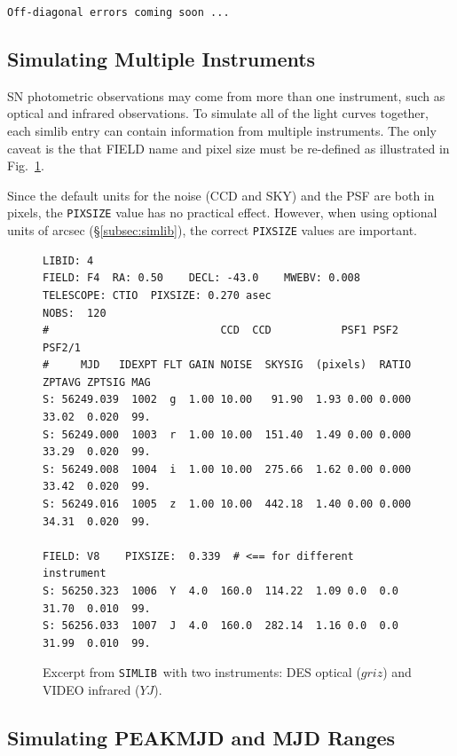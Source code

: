 \documentclass[12pt]{article}
\newcommand{\simlib}{{\tt SIMLIB}}
\begin{document}
{\bigskip
{\tt Off-diagonal errors coming soon ...}


   \clearpage
   \subsection{Simulating Multiple Instruments}
   \label{subsec:multi_telescope}

SN photometric observations may come from more than one instrument,
such as optical and infrared observations. 
To simulate all of the light curves together, 
each simlib entry can contain information from multiple
instruments. The only caveat is the that FIELD name and
pixel size must be re-defined as illustrated in 
Fig.~\ref{fig:simlib_merge}.

Since the default units for the noise (CCD and SKY)
and the PSF are both in pixels, the {\tt PIXSIZE} value
has no practical effect. However, when using optional 
units of arcsec (\S\ref{subsec:simlib}),
the correct {\tt PIXSIZE} values are important.
%
\begin{figure} [hb] 
\begin{center}
\begin{Verbatim}[frame=single]
LIBID: 4 
FIELD: F4  RA: 0.50    DECL: -43.0    MWEBV: 0.008
TELESCOPE: CTIO  PIXSIZE: 0.270 asec
NOBS:  120
#                           CCD  CCD           PSF1 PSF2 PSF2/1                    
#     MJD   IDEXPT FLT GAIN NOISE  SKYSIG  (pixels)  RATIO ZPTAVG ZPTSIG MAG 
S: 56249.039  1002  g  1.00 10.00   91.90  1.93 0.00 0.000  33.02  0.020  99.
S: 56249.000  1003  r  1.00 10.00  151.40  1.49 0.00 0.000  33.29  0.020  99.
S: 56249.008  1004  i  1.00 10.00  275.66  1.62 0.00 0.000  33.42  0.020  99.
S: 56249.016  1005  z  1.00 10.00  442.18  1.40 0.00 0.000  34.31  0.020  99.

FIELD: V8    PIXSIZE:  0.339  # <== for different instrument
S: 56250.323  1006  Y  4.0  160.0  114.22  1.09 0.0  0.0    31.70  0.010  99.
S: 56256.033  1007  J  4.0  160.0  282.14  1.16 0.0  0.0    31.99  0.010  99.
\end{Verbatim}
\end{center}
\caption{
  Excerpt from \simlib\ with two instruments:
  DES optical ($griz$) and VIDEO infrared ($YJ$).
 }
\label{fig:simlib_merge}
\end{figure}


   \clearpage
   \subsection{Simulating PEAKMJD and MJD Ranges}
   \label{subsec:mjd_ranges}

}
\end{document}

